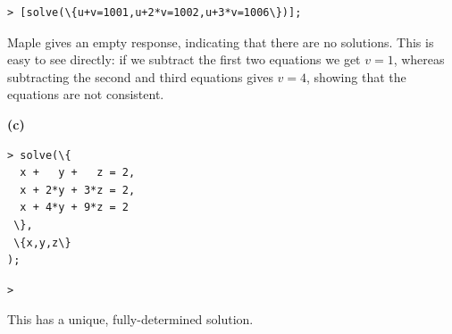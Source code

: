 \documentclass{article}
\begin{document}
\begin{lstlisting}
> [solve(\{u+v=1001,u+2*v=1002,u+3*v=1006\})];
\end{lstlisting}
Maple gives an empty response, indicating that there are no solutions.  This is easy to see directly: if we subtract the first two equations we get 
$ v =1 $, whereas subtracting the second and third equations gives 
$ v =4 $, showing that the equations are not consistent.\begin{Maple Normal}
\textbf{(c)}
\end{Maple Normal}
\begin{lstlisting}
> solve(\{
  x +   y +   z = 2,
  x + 2*y + 3*z = 2,
  x + 4*y + 9*z = 2
 \},
 \{x,y,z\}
);
\end{lstlisting}
\begin{lstlisting}
> 
\end{lstlisting}
This has a unique, fully-determined solution.
\end{document}
